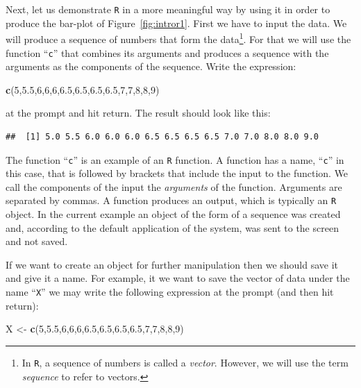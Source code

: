 \documentclass[]{krantz}
\makeatletter
\newenvironment{Shaded}{\begin{snugshade}}{\end{snugshade}}
\newcommand{\DecValTok}[1]{\textcolor[rgb]{0.00,0.00,0.81}{#1}}
\newcommand{\FloatTok}[1]{\textcolor[rgb]{0.00,0.00,0.81}{#1}}
\newcommand{\KeywordTok}[1]{\textcolor[rgb]{0.13,0.29,0.53}{\textbf{#1}}}
\newcommand{\NormalTok}[1]{#1}
\newcommand{\StringTok}[1]{\textcolor[rgb]{0.31,0.60,0.02}{#1}}
\newenvironment{kframe}{%
\medskip{}
\setlength{\fboxsep}{.8em}
 \def\at@end@of@kframe{}%
 \ifinner\ifhmode%
  \def\at@end@of@kframe{\end{minipage}}%
  \begin{minipage}{\columnwidth}%
 \fi\fi%
 \def\FrameCommand##1{\hskip\@totalleftmargin \hskip-\fboxsep
 \colorbox{shadecolor}{##1}\hskip-\fboxsep
     \hskip-\linewidth \hskip-\@totalleftmargin \hskip\columnwidth}%
 \MakeFramed {\advance\hsize-\width
   \@totalleftmargin\z@ \linewidth\hsize
   \@setminipage}}%
 {\par\unskip\endMakeFramed%
 \at@end@of@kframe}
\renewenvironment{Shaded}{\begin{kframe}}{\end{kframe}}
\theoremstyle{definition}
\theoremstyle{definition}
\theoremstyle{definition}
\theoremstyle{remark}
\makeatother
\begin{document}
Next, let us demonstrate \texttt{R} in a more meaningful way by using it in
order to produce the bar-plot of Figure~\ref{fig:intror1}. First we have
to input the data. We will produce a sequence of numbers that form the
data\footnote{In \texttt{R}, a sequence of numbers is called a \emph{vector}. However, we
  will use the term \emph{sequence} to refer to vectors.}. For that we will use the function ``\texttt{c}'' that combines its
arguments and produces a sequence with the arguments as the components
of the sequence. Write the expression:

\begin{Shaded}
\begin{Highlighting}[]
\KeywordTok{c}\NormalTok{(}\DecValTok{5}\NormalTok{,}\FloatTok{5.5}\NormalTok{,}\DecValTok{6}\NormalTok{,}\DecValTok{6}\NormalTok{,}\DecValTok{6}\NormalTok{,}\FloatTok{6.5}\NormalTok{,}\FloatTok{6.5}\NormalTok{,}\FloatTok{6.5}\NormalTok{,}\FloatTok{6.5}\NormalTok{,}\DecValTok{7}\NormalTok{,}\DecValTok{7}\NormalTok{,}\DecValTok{8}\NormalTok{,}\DecValTok{8}\NormalTok{,}\DecValTok{9}\NormalTok{)}
\end{Highlighting}
\end{Shaded}

at the prompt and hit return. The result should look like this:

\begin{verbatim}
##  [1] 5.0 5.5 6.0 6.0 6.0 6.5 6.5 6.5 6.5 7.0 7.0 8.0 8.0 9.0
\end{verbatim}

The function ``\texttt{c}'' is an example of an \texttt{R} function. A function has a
name, ``\texttt{c}'' in this case, that is followed by brackets that include the
input to the function. We call the components of the input the
\emph{arguments} of the function. Arguments are separated by commas. A
function produces an output, which is typically an \texttt{R} object. In the
current example an object of the form of a sequence was created and,
according to the default application of the system, was sent to the
screen and not saved.

If we want to create an object for further manipulation then we should
save it and give it a name. For example, it we want to save the vector
of data under the name ``\texttt{X}'' we may write the following expression at
the prompt (and then hit return):

\begin{Shaded}
\begin{Highlighting}[]
\NormalTok{X <-}\StringTok{ }\KeywordTok{c}\NormalTok{(}\DecValTok{5}\NormalTok{,}\FloatTok{5.5}\NormalTok{,}\DecValTok{6}\NormalTok{,}\DecValTok{6}\NormalTok{,}\DecValTok{6}\NormalTok{,}\FloatTok{6.5}\NormalTok{,}\FloatTok{6.5}\NormalTok{,}\FloatTok{6.5}\NormalTok{,}\FloatTok{6.5}\NormalTok{,}\DecValTok{7}\NormalTok{,}\DecValTok{7}\NormalTok{,}\DecValTok{8}\NormalTok{,}\DecValTok{8}\NormalTok{,}\DecValTok{9}\NormalTok{)}
\end{Highlighting}
\end{Shaded}
\end{document}
